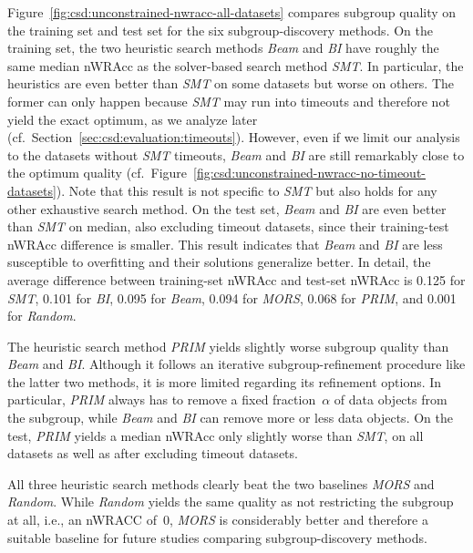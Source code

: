 \documentclass{article}
\theoremstyle{definition}
\begin{document}
Figure~\ref{fig:csd:unconstrained-nwracc-all-datasets} compares subgroup quality on the training set and test set for the six subgroup-discovery methods.
On the training set, the two heuristic search methods \emph{Beam} and \emph{BI} have roughly the same median nWRAcc as the solver-based search method \emph{SMT}.
In particular, the heuristics are even better than \emph{SMT} on some datasets but worse on others.
The former can only happen because \emph{SMT} may run into timeouts and therefore not yield the exact optimum, as we analyze later (cf.~Section~\ref{sec:csd:evaluation:timeouts}).
However, even if we limit our analysis to the datasets without \emph{SMT} timeouts, \emph{Beam} and \emph{BI} are still remarkably close to the optimum quality (cf.~Figure~\ref{fig:csd:unconstrained-nwracc-no-timeout-datasets}).
Note that this result is not specific to \emph{SMT} but also holds for any other exhaustive search method.
On the test set, \emph{Beam} and \emph{BI} are even better than \emph{SMT} on median, also excluding timeout datasets, since their training-test nWRAcc difference is smaller.
This result indicates that \emph{Beam} and \emph{BI} are less susceptible to overfitting and their solutions generalize better.
In detail, the average difference between training-set nWRAcc and test-set nWRAcc is 0.125 for \emph{SMT}, 0.101 for \emph{BI}, 0.095 for \emph{Beam}, 0.094 for \emph{MORS}, 0.068 for \emph{PRIM}, and 0.001 for \emph{Random}.

The heuristic search method \emph{PRIM} yields slightly worse subgroup quality than \emph{Beam} and \emph{BI}.
Although it follows an iterative subgroup-refinement procedure like the latter two methods, it is more limited regarding its refinement options.
In particular, \emph{PRIM} always has to remove a fixed fraction~$\alpha$ of data objects from the subgroup, while \emph{Beam} and \emph{BI} can remove more or less data objects.
On the test, \emph{PRIM} yields a median nWRAcc only slightly worse than \emph{SMT}, on all datasets as well as after excluding timeout datasets.

All three heuristic search methods clearly beat the two baselines \emph{MORS} and \emph{Random}.
While \emph{Random} yields the same quality as not restricting the subgroup at all, i.e., an nWRACC of~0, \emph{MORS} is considerably better and therefore a suitable baseline for future studies comparing subgroup-discovery methods.
\end{document}
